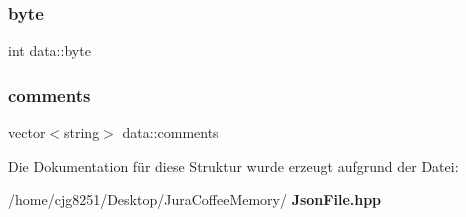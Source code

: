 \subsubsection{byte}
{\footnotesize\ttfamily int data\+::byte}

\mbox{\label{structdata_af51dbf60e89ceee3d059779968b9b947}} 
\subsubsection{comments}
{\footnotesize\ttfamily vector$<$string$>$ data\+::comments}



Die Dokumentation für diese Struktur wurde erzeugt aufgrund der Datei\+:\begin{DoxyCompactItemize}
\item 
/home/cjg8251/\+Desktop/\+Jura\+Coffee\+Memory/\textbf{ Json\+File.\+hpp}\end{DoxyCompactItemize}
